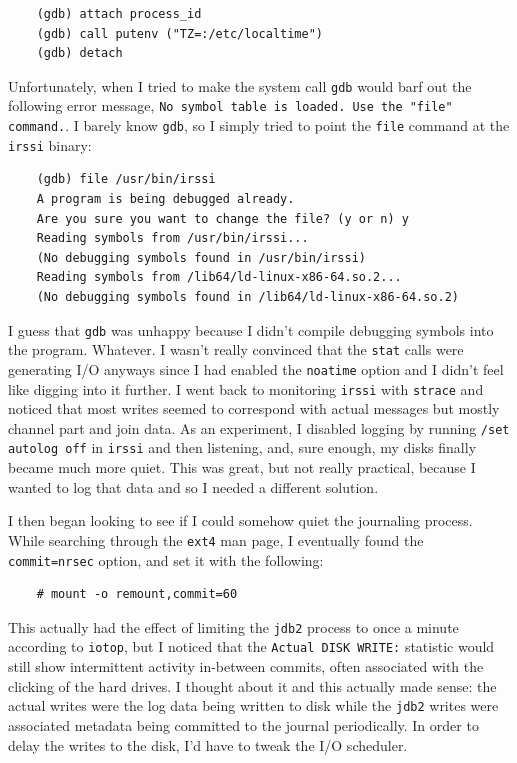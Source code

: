 \documentclass{article}
\begin{document}
\begin{verbatim}
	(gdb) attach process_id
	(gdb) call putenv ("TZ=:/etc/localtime")
	(gdb) detach
\end{verbatim}
Unfortunately, when I tried to make the system call \texttt{gdb} would barf out the following error message, \texttt{No symbol table is loaded.  Use the "file" command.}.  I barely know \texttt{gdb}, so I simply tried to point the \texttt{file} command at the \texttt{irssi} binary:
\begin{verbatim}
	(gdb) file /usr/bin/irssi
	A program is being debugged already.
	Are you sure you want to change the file? (y or n) y
	Reading symbols from /usr/bin/irssi...
	(No debugging symbols found in /usr/bin/irssi)
	Reading symbols from /lib64/ld-linux-x86-64.so.2...
	(No debugging symbols found in /lib64/ld-linux-x86-64.so.2)
\end{verbatim}
I guess that \texttt{gdb} was unhappy because I didn't compile debugging symbols into the program.  Whatever.  I wasn't really convinced that the \texttt{stat} calls were generating I/O anyways since I had enabled the \texttt{noatime} option and I didn't feel like digging into it further.  I went back to monitoring \texttt{irssi} with \texttt{strace} and noticed that most writes seemed to correspond with actual messages but mostly channel part and join data.  As an experiment, I disabled logging by running \texttt{/set autolog off} in \texttt{irssi} and then listening, and, sure enough, my disks finally became much more quiet.  This was great, but not really practical, because I wanted to log that data and so I needed a different solution.

I then began looking to see if I could somehow quiet the journaling process.  While searching through the \texttt{ext4} man page, I eventually found the \texttt{commit=nrsec} option, and set it with the following:
\begin{verbatim}
	# mount -o remount,commit=60
\end{verbatim}
This actually had the effect of limiting the \texttt{jdb2} process to once a minute according to \texttt{iotop}, but I noticed that the \texttt{Actual DISK WRITE:} statistic would still show intermittent activity in-between commits, often associated with the clicking of the hard drives.  I thought about it and this actually made sense: the actual writes were the log data being written to disk while the \texttt{jdb2} writes were associated metadata being committed to the journal periodically.  In order to delay the writes to the disk, I'd have to tweak the I/O scheduler.
\end{document}
